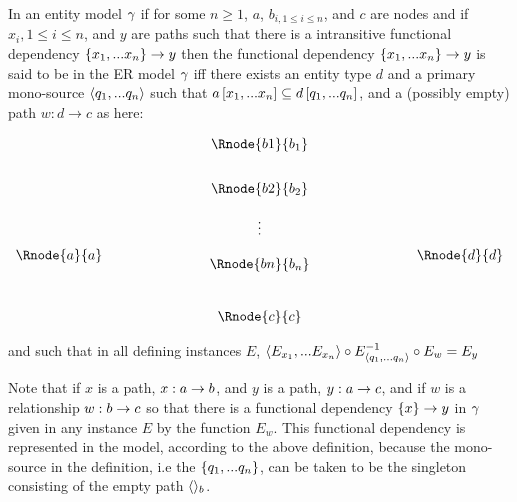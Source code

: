 \begin{definition}
\noindent In an entity model $\gamma$  
if for some $n \geq 1$, $a$, $b_{i, 1 \leq i \leq n}$,  and $c$ are nodes and 
if  $x_{i}, 1 \leq i \leq n$, and $y$ are paths such
that there is a intransitive functional dependency $\{x_1,...x_n\} \rightarrow y$
 then the functional dependency $\{x_1,...x_n\} \rightarrow y$ is said to be  in the ER model $\gamma$ iff  there exists an entity type $d$ and a primary mono-source 
$\langle q_1,...q_n\rangle$  such that $a\left[x_1,...x_n\right]\subseteq d\left[q_1,...q_n\right]$, and a (possibly empty)
path $w:d\rightarrow c$ as here:

\setlength{\arraycolsep}{.2cm}
\begin{center}
$
\begin{array}{cp{2cm}c p{2cm} c}
             &  & \Rnode{b1}{b_1} & &               \\ [0.7cm]
						 &  & \Rnode{b2}{b_2} & &               \\ [0.4cm]
						 &  &     \vdots      & &               \\ [0.2cm]
\Rnode{a}{a} &  &                 & & \Rnode{d}{d}  \\ [-0.2cm]
             &  & \Rnode{bn}{b_n} & &               \\ [0.9cm]
             &  & \Rnode{c}{c}    & &               \\
\end{array}
$
\end{center}

and such that in all defining instances $E$, 
$\langle E_{x_1},...E_{x_n}\rangle \circ E^{-1}_{\langle q_1,...q_n\rangle}\circ E_w = E_y$
\end{definition}

Note that  if $x$ is a path, $x:a \rightarrow b$, and $y$ is a path, $y: a \rightarrow c$, and if $w$ is a
relationship $w: b \rightarrow c$ so that there is a functional dependency $\left\{x\right\} \rightarrow y$ in $\gamma$
given in any instance $E$ by the function $E_w$. This functional dependency is represented in the model, according to the above definition, because the mono-source in the definition, i.e the $\left\{q_1,...q_n\right\}$,
can be taken to be the singleton consisting of the empty path $\langle\rangle_b$. \\

